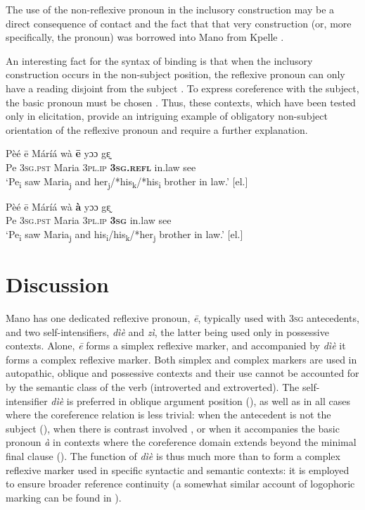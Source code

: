 \documentclass[output=paper]{langscibook}
\begin{document}
The use of the non-reflexive pronoun in the inclusory construction may be a direct consequence of contact and the fact that that very construction (or, more specifically, the pronoun) was borrowed into Mano from Kpelle \citep{Khachaturyan2019}.

An interesting fact for the syntax of binding is that when the inclusory construction occurs in the non-subject position, the reflexive pronoun can only have a reading disjoint from the subject . To express coreference with the subject, the basic pronoun must be chosen . Thus, these contexts, which have been tested only in elicitation, provide an intriguing example of obligatory non-subject orientation of the reflexive pronoun and require a further explanation.

\ea
    \label{ex:Kachaturyan:47}
 \gll Pèé  ē  Máríá  wà    \textbf{ē}  yɔɔ  gɛ̰\\
     Pe  \textsc{3sg.pst}  Maria \textsc{3pl.ip} \textbf{\textsc{3sg.refl}} in.law see\\
\glt ‘Pe\textsubscript{i} saw Maria\textsubscript{j} and her\textsubscript{j}/*his\textsubscript{k}/*his\textsubscript{i} brother in law.’ [el.]\z

\ea
    \label{ex:Kachaturyan:48}
 \gll Pèé  ē  Máríá  wà    \textbf{à}  yɔɔ  gɛ̰\\
     Pe  \textsc{3sg.pst}  Maria \textsc{3pl.ip} \textbf{\textsc{3sg}} in.law see\\
\glt ‘Pe\textsubscript{i} saw Maria\textsubscript{j} and his\textsubscript{i}/his\textsubscript{k}/*her\textsubscript{j} brother in law.’ [el.]\z


 \section{Discussion}\label{sec:Kachaturyan:8}

Mano has one dedicated reflexive pronoun, \textit{ē}, typically used with \textsc{3sg} antecedents, and two self-intensifiers, \textit{dìè} and \textit{zì}, the latter being used only in possessive contexts. Alone, \textit{ē} forms a simplex reflexive marker, and accompanied by \textit{dìè} it forms a complex reflexive marker. Both simplex and complex markers are used in autopathic, oblique and possessive contexts and their use cannot be accounted for by the semantic class of the verb (introverted and extroverted). The self-intensifier \textit{dìè} is preferred in oblique argument position (), as well as in all cases where the coreference relation is less trivial: when the antecedent is not the subject (), when there is contrast involved , or when it accompanies the basic pronoun \textit{à} in contexts where the coreference domain extends beyond the minimal final clause (). The function of \textit{dìè} is thus much more than to form a complex reflexive marker used in specific syntactic and semantic contexts: it is employed to ensure broader reference continuity (a somewhat similar account of logophoric marking can be found in \citealt{Dimmendaal2001}).
\end{document}
